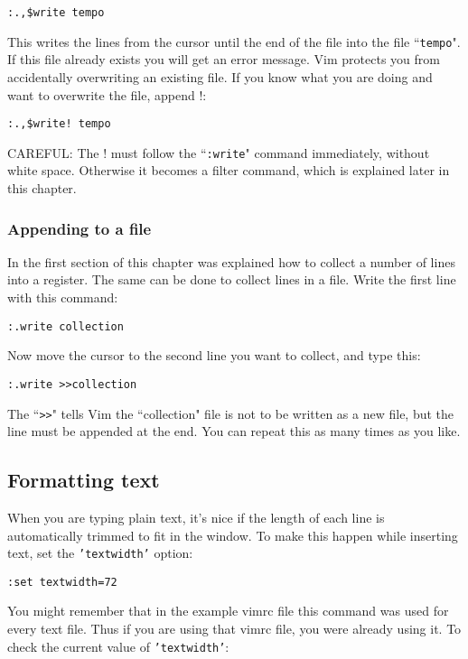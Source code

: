 \begin{Verbatim}[samepage=true]
 :.,$write tempo
\end{Verbatim}

This writes the lines from the cursor until the end of the file into the file ``\texttt{tempo}".
If this file already exists you will get an error message.
Vim protects you from accidentally overwriting an existing file.
If you know what you are doing and want to overwrite the file, append !:

\begin{Verbatim}[samepage=true]
 :.,$write! tempo
\end{Verbatim}

CAREFUL: The ! must follow the ``\texttt{:write}" command immediately, without white space.
Otherwise it becomes a filter command, which is explained later in this chapter.
\subsubsection{Appending to a file}
In the first section of this chapter was explained how to collect a number of lines into a register.
The same can be done to collect lines in a file.
Write the first line with this command:

\begin{Verbatim}[samepage=true]
 :.write collection
\end{Verbatim}

Now move the cursor to the second line you want to collect, and type this:

\begin{Verbatim}[samepage=true]
 :.write >>collection
\end{Verbatim}

The ``\texttt{>>}" tells Vim the ``collection" file is not to be written as a new file, but the line must be appended at the end.
You can repeat this as many times as you like.
\subsection{Formatting text}
When you are typing plain text, it's nice if the length of each line is automatically trimmed to fit in the window.
To make this happen while inserting text, set the \texttt{'textwidth'} option:

\begin{Verbatim}[samepage=true]
 :set textwidth=72
\end{Verbatim}

You might remember that in the example vimrc file this command was used for every text file.
Thus if you are using that vimrc file, you were already using it.
To check the current value of \texttt{'textwidth'}:

